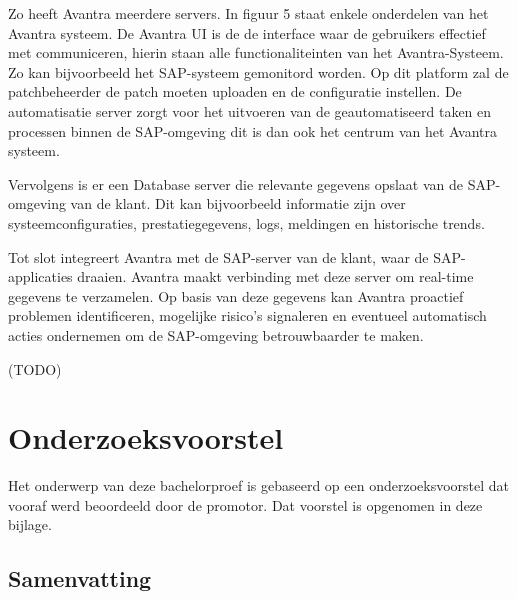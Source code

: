 \documentclass[dutch,dit,thesis]{hogentreport}
\begin{document}
Zo heeft Avantra meerdere servers. In figuur 5 staat enkele onderdelen van het Avantra systeem. De Avantra UI is de de interface waar de gebruikers effectief met communiceren, hierin staan alle functionaliteinten van het Avantra-Systeem. Zo kan bijvoorbeeld het SAP-systeem gemonitord worden. Op
dit platform zal de patchbeheerder de patch moeten uploaden en de configuratie instellen. De automatisatie server zorgt voor het uitvoeren van de geautomatiseerd taken en processen binnen de SAP-omgeving dit is dan ook het centrum van het Avantra systeem.

Vervolgens is er een Database server die relevante gegevens opslaat van de SAP-omgeving van de klant. Dit kan bijvoorbeeld informatie zijn over systeemconfiguraties, prestatiegegevens, logs, meldingen en historische trends. 

Tot slot integreert Avantra met de SAP-server van de klant, waar de SAP-applicaties draaien. Avantra maakt verbinding met deze server om real-time gegevens te verzamelen.
Op basis van deze gegevens kan Avantra proactief problemen identificeren, mogelijke risico's signaleren en eventueel automatisch acties ondernemen om de SAP-omgeving betrouwbaarder te maken.

(TODO)


%
%




\appendix

\chapter{Onderzoeksvoorstel}

Het onderwerp van deze bachelorproef is gebaseerd op een onderzoeksvoorstel dat vooraf werd beoordeeld door de promotor. Dat voorstel is opgenomen in deze bijlage.




\section*{Samenvatting}




\end{document}
